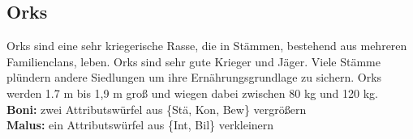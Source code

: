 \documentclass[../../Heldenanleitung2]{subfiles}
\begin{document}
\subsection{Orks}
Orks sind eine sehr kriegerische Rasse, die in Stämmen, bestehend aus mehreren Familienclans, leben. Orks sind sehr gute Krieger und Jäger. Viele Stämme plündern andere Siedlungen um ihre Ernährungsgrundlage zu sichern. Orks werden 1.7 m bis 1,9 m groß und wiegen dabei zwischen 80 kg und 120 kg.\\
\textbf{Boni:} zwei Attributswürfel aus \{Stä, Kon, Bew\} vergrößern\\
\textbf{Malus:} ein Attributswürfel aus \{Int, Bil\} verkleinern

\newpage
%
%
\end{document}
